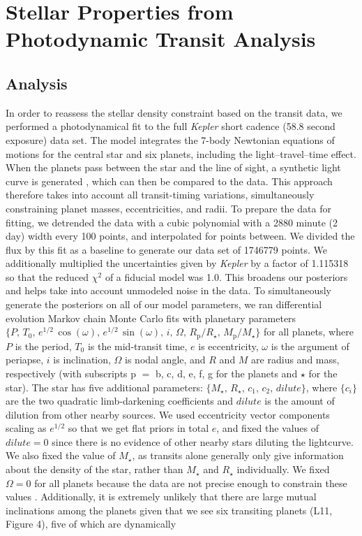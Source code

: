 \documentclass[twocolumn,trackchanges]{aastex61}
\newcommand{\Kepler}{\textit{Kepler} }
\begin{document}




\section{Stellar Properties from Photodynamic Transit Analysis}
\label{s:ttvs}

\subsection{Analysis}

In order to reassess the stellar density constraint based on the transit data, we performed a photodynamical fit to the full \Kepler short cadence (58.8 second exposure) data set. The model integrates the 7-body Newtonian equations of motions for the central star and six planets, including the light--travel--time effect. When the planets pass between the star and the line of sight, a synthetic light curve is generated \citep{2012MNRAS.420.1630P}, which can then be compared to the data. This approach therefore takes into account all transit-timing variations, simultaneously constraining planet masses, eccentricities, and radii. To prepare the data for fitting, we detrended the data with a cubic polynomial with a 2880 minute (2 day) width every 100 points, and interpolated for points between. We divided the flux by this fit as a baseline to generate our data set of 1746779 points. We additionally multiplied the uncertainties given by \Kepler by a factor of 1.115318 so that the reduced $\chi^2$ of a fiducial model was 1.0. This broadens our posteriors and helps take into account unmodeled noise in the data. To simultaneously generate the posteriors on all of our model parameters, we ran differential evolution Markov chain Monte Carlo \cite[DEMCMC, ][]{TerBraak2005} fits with planetary parameters $\{P,\, T_0,\, e^{1/2} \, \cos(\omega),\, e^{1/2} \, \sin(\omega),\, i,\, \Omega,\, R_\mathrm{p}/R_\star,\, M_\mathrm{p}/M_\star\}$ for all planets, where $P$ is the period, $T_0$ is the mid-transit time, $e$ is eccentricity, $\omega$ is the argument of periapse, $i$ is inclination, $\Omega$ is nodal angle, and $R$ and $M$ are radius and mass, respectively (with subscripts p $=$ b, c, d, e, f, g for the planets and $\star$ for the star). The star has five additional parameters: $\{M_\star,\, R_\star,\, c_1,\, c_2,\, dilute\}$, where $\{c_i\}$ are the two quadratic limb-darkening coefficients and $dilute$ is the amount of dilution from other nearby sources. We used eccentricity vector components scaling as $e^{1/2}$ so that we get flat priors in total $e$, and fixed the values of $dilute=0$ since there is no evidence of other nearby stars diluting the lightcurve. We also fixed the value of $M_\star$, as transits alone generally only give information about the density of the star, rather than $M_\star$ and $R_\star$ individually. We fixed $\Omega = 0$ for all planets because the data are not precise enough to constrain these values \citep{Migaszewski2012}. Additionally, it is extremely unlikely that there are large mutual inclinations among the planets given that we see six transiting planets (L11, Figure 4), five of which are dynamically 
\end{document}
